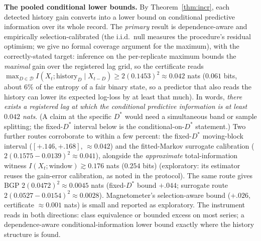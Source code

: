 \documentclass[11pt]{article}
\begin{document}
\textbf{The pooled conditional lower bounds.} By
Theorem~\ref{thm:incr}, each detected history gain converts into a lower
bound on conditional predictive information over its whole record. The \emph{primary} result is dependence-aware and
empirically selection-calibrated (the i.i.d.\ null measures the
procedure's residual optimism; we give no formal coverage argument for the
maximum), with the correctly-stated target: inference on the per-replicate maximum bounds the
\emph{maximal} gain over the registered lag grid, so the certificate
reads
$\max_{D\in\mathcal D} I(X_t;\text{history}_D\mid X_{t-D})
\ge 2(0.1453)^2\approx0.042$ nats ($0.061$ bits, about $6\%$ of the
entropy of a fair binary state, so a predictor that also reads the history
can lower its expected log-loss by at least that much). In words, \emph{there exists a registered
lag at which the conditional predictive information is at least
$0.042$ nats}. (A claim at the specific $D^*$ would need a simultaneous
band or sample splitting; the fixed-$D^*$ interval below is the
conditional-on-$D^*$ statement.) Two further routes
corroborate to within a few percent: the fixed-$D^*$ moving-block
interval ($[+.146,+.168]$, $\approx0.042$) and the fitted-Markov
surrogate calibration ($2(0.1575-0.0139)^2\approx0.041$), alongside the \emph{approximate} total-information witness
$I(X_t;\text{window})\gtrsim0.176$ nats ($0.254$ bits) (exploratory: its estimator
reuses the gain-error calibration, as noted in the protocol). The same
route gives BGP $2(0.0472)^2\approx0.0045$ nats (fixed-$D^*$ bound $+.044$;
surrogate route $2(0.0527-0.0154)^2\approx0.0028$). Magnetometer's selection-aware bound ($+.026$, certificate
$\approx0.001$ nats) is small and reported as exploratory. The instrument reads in
both directions: class equivalence or bounded excess on most series; a
dependence-aware conditional-information lower bound exactly where the
history structure is found.
\end{document}
